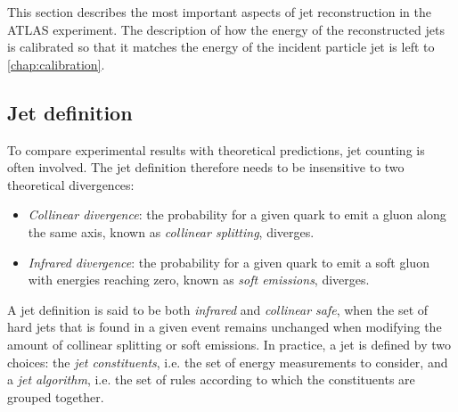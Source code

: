 This section describes the most important aspects of jet reconstruction in the ATLAS experiment.
The description of how the energy of the reconstructed jets is calibrated so that it matches the energy of the incident particle jet is left to \cref{chap:calibration}.

\subsection{Jet definition}
To compare experimental results with theoretical predictions, jet counting is often involved. The jet definition therefore needs to be insensitive to two theoretical divergences:
\begin{itemize}
    \item \emph{Collinear divergence}: the probability for a given quark to emit a gluon along the same axis, known as \emph{collinear splitting}, diverges.
    \item \emph{Infrared divergence}: the probability for a given quark to emit a soft gluon with energies reaching zero, known as \emph{soft emissions}, diverges.
\end{itemize}
A jet definition is said to be both \emph{infrared} and \emph{collinear safe}, when the set of hard jets that is found in a given event remains unchanged when modifying the amount of collinear splitting or soft emissions.
In practice, a jet is defined by two choices: the \emph{jet constituents}, i.e. the set of energy measurements to consider, and a \emph{jet algorithm}, i.e. the set of rules according to which the constituents are grouped together.

